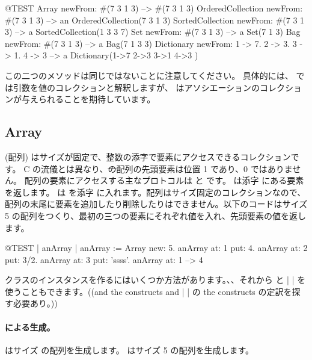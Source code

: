 \documentclass[a4paper,10pt,twoside]{book}
\begin{document}
\begin{code}{@TEST}
Array newFrom: #(7 3 1 3)                                          --> #(7 3 1 3)
OrderedCollection newFrom: #(7 3 1 3)                     --> an OrderedCollection(7 3 1 3)
SortedCollection newFrom: #(7 3 1 3)                       --> a SortedCollection(1 3 3 7)
Set newFrom: #(7 3 1 3)                                            --> a Set(7 1 3)
Bag newFrom: #(7 3 1 3)                                           --> a Bag(7 1 3 3)
Dictionary newFrom: {1 -> 7. 2 -> 3. 3 -> 1. 4 -> 3} --> a Dictionary(1->7 2->3 3->1 4->3 )
\end{code}
\noindent
この二つのメソッドは同じではないことに注意してください。
具体的には、 では引数を値のコレクションと解釈しますが、 はアソシエーションのコレクションが与えられることを期待しています。

\subsection{Array}
 (配列) はサイズが固定で、整数の添字で要素にアクセスできるコレクションです。
C の流儀とは異なり、\st の配列の先頭要素は位置 1 であり、0 ではありません。
配列の要素にアクセスする主なプロトコルは  と  です。 は添字  にある要素を返します。 は  を添字  に入れます。配列はサイズ固定のコレクションなので、配列の末尾に要素を追加したり削除したりはできません。以下のコードはサイズ 5 の配列をつくり、最初の三つの要素にそれぞれ値を入れ、先頭要素の値を返します。

\begin{code}{@TEST | anArray | }
anArray := Array new: 5.
anArray at: 1 put: 4.
anArray at: 2 put: 3/2.
anArray at: 3 put: 'ssss'.
anArray at: 1 --> 4
\end{code}

 クラスのインスタンスを作るにはいくつか方法があります。、、それから \ct{#( )} と \ct|{ }| を使うこともできます。((and  the constructs \ct{#( )} and \ct|{ }| の the constructs の定訳を探す必要あり。))

\paragraph{ による生成。}  はサイズ  の配列を生成します。
 はサイズ 5 の配列を生成します。
\end{document}

